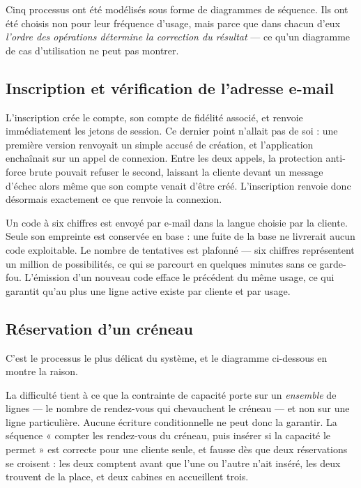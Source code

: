 Cinq processus ont été modélisés sous forme de diagrammes de séquence. Ils ont
été choisis non pour leur fréquence d'usage, mais parce que dans chacun d'eux
\emph{l'ordre des opérations détermine la correction du résultat} --- ce qu'un
diagramme de cas d'utilisation ne peut pas montrer.

\subsection{Inscription et vérification de l'adresse e-mail}


L'inscription crée le compte, son compte de fidélité associé, et renvoie
immédiatement les jetons de session. Ce dernier point n'allait pas de soi : une
première version renvoyait un simple accusé de création, et l'application
enchaînait sur un appel de connexion. Entre les deux appels, la protection
anti-force brute pouvait refuser le second, laissant la cliente devant un
message d'échec alors même que son compte venait d'être créé. L'inscription
renvoie donc désormais exactement ce que renvoie la connexion.

Un code à six chiffres est envoyé par e-mail dans la langue choisie par la
cliente. Seule son empreinte est conservée en base : une fuite de la base ne
livrerait aucun code exploitable. Le nombre de tentatives est plafonné --- six
chiffres représentent un million de possibilités, ce qui se parcourt en
quelques minutes sans ce garde-fou. L'émission d'un nouveau code efface le
précédent du même usage, ce qui garantit qu'au plus une ligne active existe par
cliente et par usage.

\subsection{Réservation d'un créneau}

C'est le processus le plus délicat du système, et le diagramme ci-dessous en
montre la raison.


La difficulté tient à ce que la contrainte de capacité porte sur un
\emph{ensemble} de lignes --- le nombre de rendez-vous qui chevauchent le
créneau --- et non sur une ligne particulière. Aucune écriture conditionnelle
ne peut donc la garantir. La séquence « compter les rendez-vous du créneau,
puis insérer si la capacité le permet » est correcte pour une cliente seule, et
fausse dès que deux réservations se croisent : les deux comptent avant que
l'une ou l'autre n'ait inséré, les deux trouvent de la place, et deux cabines
en accueillent trois.

